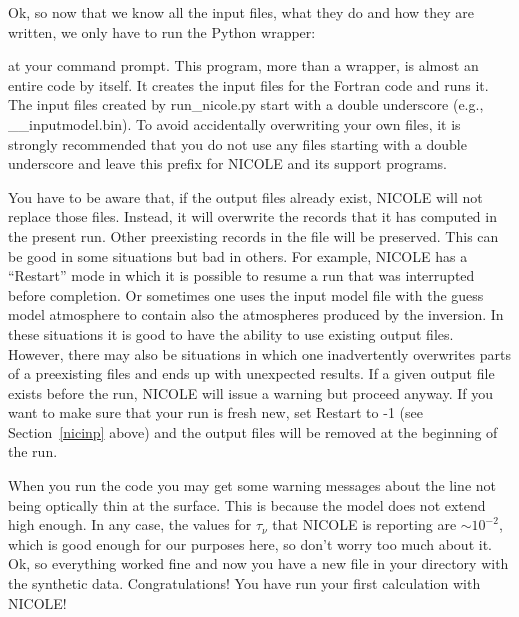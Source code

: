 Ok, so now that we know all the input files, what they do and how they 
are written, we only have to run the Python wrapper:

\vskip12pt
\vskip12pt

at your command prompt. This program, more than a wrapper, is almost an
entire code by itself. It creates the input files for the
Fortran code and runs it. The input files created by run\_nicole.py
start with a double underscore (e.g., \_\_inputmodel.bin). To avoid
accidentally overwriting your own files, it is strongly recommended that
you do not use any files starting with a double underscore and leave
this prefix for NICOLE and its support programs.

You have to be aware that, if the output files already exist, NICOLE
will not replace those files. Instead, it will overwrite the records
that it has computed in the present run. Other preexisting records in
the file will be preserved. This can be good in some situations but
bad in others. For example, NICOLE has a ``Restart'' mode in which it
is possible to resume a run that was interrupted before completion. Or
sometimes one uses the input model file with the guess model
atmosphere to contain also the atmospheres produced by the
inversion. In these situations it is good to have the ability to use
existing output files. However, there may also be situations in which
one inadvertently overwrites parts of a preexisting files and ends up
with unexpected results. If a given output file exists before the run,
NICOLE will issue a warning but proceed anyway. If you want to make
sure that your run is fresh new, set Restart to -1 (see
Section~\ref{nicinp} above) and the output files will be removed at
the beginning of the run.

When you run the code you may get some warning messages about the line
not being optically thin at the surface. This is because the model
does not extend high enough. In any case, the values for $\tau_\nu$
that NICOLE is reporting are $\sim 10^{-2}$, which is good enough for
our purposes here, so don't worry too much about it. Ok, so everything
worked fine and now you have a new file in your directory with the
synthetic data.  Congratulations! You have run your first calculation
with NICOLE!

